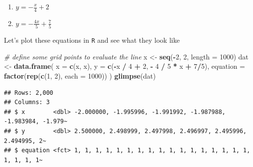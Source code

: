 \documentclass[
]{book}
\newenvironment{Shaded}{\begin{snugshade}}{\end{snugshade}}
\newcommand{\CommentTok}[1]{\textcolor[rgb]{0.56,0.35,0.01}{\textit{#1}}}
\newcommand{\DataTypeTok}[1]{\textcolor[rgb]{0.13,0.29,0.53}{#1}}
\newcommand{\DecValTok}[1]{\textcolor[rgb]{0.00,0.00,0.81}{#1}}
\newcommand{\KeywordTok}[1]{\textcolor[rgb]{0.13,0.29,0.53}{\textbf{#1}}}
\newcommand{\NormalTok}[1]{#1}
\newcommand{\OperatorTok}[1]{\textcolor[rgb]{0.81,0.36,0.00}{\textbf{#1}}}
\newcommand{\StringTok}[1]{\textcolor[rgb]{0.31,0.60,0.02}{#1}}
\providecommand{\tightlist}{%
  \setlength{\itemsep}{0pt}\setlength{\parskip}{0pt}}
\theoremstyle{definition}
\theoremstyle{definition}
\theoremstyle{definition}
\theoremstyle{definition}
\theoremstyle{remark}
\begin{document}
\begin{enumerate}
\def\labelenumi{\arabic{enumi})}
\tightlist
\item
  \(y = -\frac{x}{4} + 2\)
\item
  \(y = -\frac{4x}{5} + \frac{7}{5}\)
\end{enumerate}

Let's plot these equations in \texttt{R} and see what they look like

\begin{Shaded}
\begin{Highlighting}[]
\CommentTok{# define some grid points to evaluate the line}
\NormalTok{x <-}\StringTok{ }\KeywordTok{seq}\NormalTok{(}\OperatorTok{-}\DecValTok{2}\NormalTok{, }\DecValTok{2}\NormalTok{, }\DataTypeTok{length =} \DecValTok{1000}\NormalTok{)}
\NormalTok{dat <-}\StringTok{ }\KeywordTok{data.frame}\NormalTok{(}
    \DataTypeTok{x =} \KeywordTok{c}\NormalTok{(x, x),}
    \DataTypeTok{y =} \KeywordTok{c}\NormalTok{(}\OperatorTok{-}\NormalTok{x }\OperatorTok{/}\StringTok{ }\DecValTok{4} \OperatorTok{+}\StringTok{ }\DecValTok{2}\NormalTok{, }\OperatorTok{-}\StringTok{ }\DecValTok{4} \OperatorTok{/}\StringTok{ }\DecValTok{5} \OperatorTok{*}\StringTok{ }\NormalTok{x }\OperatorTok{+}\StringTok{ }\DecValTok{7}\OperatorTok{/}\DecValTok{5}\NormalTok{),}
    \DataTypeTok{equation =} \KeywordTok{factor}\NormalTok{(}\KeywordTok{rep}\NormalTok{(}\KeywordTok{c}\NormalTok{(}\DecValTok{1}\NormalTok{, }\DecValTok{2}\NormalTok{), }\DataTypeTok{each =} \DecValTok{1000}\NormalTok{))}
\NormalTok{)}
\KeywordTok{glimpse}\NormalTok{(dat)}
\end{Highlighting}
\end{Shaded}

\begin{verbatim}
## Rows: 2,000
## Columns: 3
## $ x        <dbl> -2.000000, -1.995996, -1.991992, -1.987988, -1.983984, -1.979~
## $ y        <dbl> 2.500000, 2.498999, 2.497998, 2.496997, 2.495996, 2.494995, 2~
## $ equation <fct> 1, 1, 1, 1, 1, 1, 1, 1, 1, 1, 1, 1, 1, 1, 1, 1, 1, 1, 1, 1, 1~
\end{verbatim}
\end{document}
